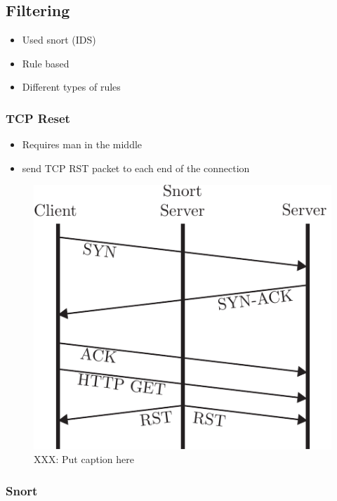 
\subsection{Filtering}

\begin{itemize}
    \item Used snort (IDS)
    \item Rule based
    \item Different types of rules
\end{itemize}

\subsubsection{TCP Reset}

\begin{itemize}
    \item Requires man in the middle
    \item send TCP RST packet to each end of the connection
\end{itemize}

\begin{figure}[!t]
    \centering
    \includegraphics[width=.8\columnwidth]{figures/tcp_reset}
    \caption{XXX: Put caption here}
    \label{fig:tcp_reset}
\end{figure}

\subsubsection{Snort}

